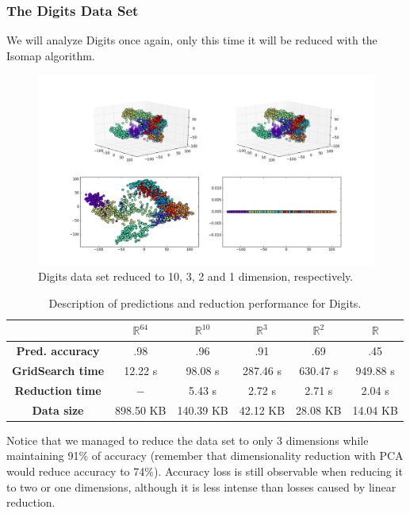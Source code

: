 \documentclass[12pt]{article}
\begin{document}
\subsubsection{The Digits Data Set}

We will analyze Digits once again, only this time it will be reduced with the Isomap algorithm.

\begin{figure}[H]
	\centering
	\includegraphics[width=\linewidth]{dsdigitsiso}
	\captionsetup{justification=centering}
	\caption{Digits data set reduced to 10, 3, 2 and 1 dimension, respectively.}
	\label{fig:dsdigitsiso}
\end{figure}

\begin{table}[H]
	\centering
	\begin{tabular}{|c|c|c|c|c|c|}
		\hline
		& \textbf{$\mathbb{R}^{64}$} & \textbf{$\mathbb{R}^{10}$} & \textbf{$\mathbb{R}^3$} & \textbf{$\mathbb{R}^2$} & \textbf{$\mathbb{R}$} \\\hline
		\textbf{Pred. accuracy}   & .98 & .96 & .91 & .69 & .45 \\\hline
		\textbf{GridSearch time} & 12.22 s & 98.08 s & 287.46 s & 630.47 s & 949.88 s \\\hline
		\textbf{Reduction time}  & $-$ & 5.43 s & 2.72 s & 2.71 s & 2.04 s \\\hline
		\textbf{Data size} & 898.50 KB & 140.39 KB & 42.12 KB & 28.08 KB & 14.04 KB \\\hline
	\end{tabular}

	\caption{Description of predictions and reduction performance for Digits.}
\end{table}

Notice that we managed to reduce the data set to only 3 dimensions while maintaining 91\% of accuracy (remember that dimensionality reduction with PCA would reduce accuracy to 74\%). Accuracy loss is still observable when reducing it to two or one dimensions, although it is less intense than losses caused by linear reduction.
\end{document}
